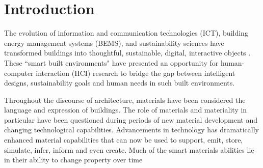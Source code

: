 \documentclass[manuscript, anonymous, review]{acmart}
\begin{document}



 
\maketitle

\section{Introduction}
The evolution of information and communication technologies (ICT), building energy management systems (BEMS), and sustainability sciences have transformed buildings into thoughtful, sustainable, digital, interactive objects \cite{nembrini2017human}. These ``smart built environments" have presented an opportunity for human-computer interaction (HCI) research to bridge the gap between intelligent designs, sustainability goals and human needs in such built environments.  

Throughout the discourse of architecture, materials have been considered the language and expression of buildings. The role of materials and materiality in particular have been questioned during periods of new material development and changing technological capabilities. Advancements in technology has dramatically enhanced material capabilities that can now be used to support, emit, store, simulate, infer, inform and even create. Much of the smart materials abilities lie in their ability to change property over time
\end{document}
